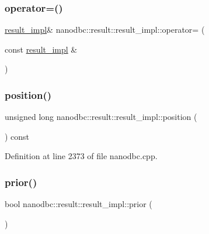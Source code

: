 \subsubsection{\texorpdfstring{operator=()}{operator=()}}
{\footnotesize\ttfamily \mbox{\hyperlink{classnanodbc_1_1result_1_1result__impl}{result\+\_\+impl}}\& nanodbc\+::result\+::result\+\_\+impl\+::operator= (\begin{DoxyParamCaption}\item[{const \mbox{\hyperlink{classnanodbc_1_1result_1_1result__impl}{result\+\_\+impl}} \&}]{ }\end{DoxyParamCaption})\hspace{0.3cm}{\ttfamily [delete]}}

\mbox{\label{classnanodbc_1_1result_1_1result__impl_a7e39dd29b851a1fedcd56d75fb2a0480}} 
\subsubsection{\texorpdfstring{position()}{position()}}
{\footnotesize\ttfamily unsigned long nanodbc\+::result\+::result\+\_\+impl\+::position (\begin{DoxyParamCaption}{ }\end{DoxyParamCaption}) const\hspace{0.3cm}{\ttfamily [inline]}}



Definition at line 2373 of file nanodbc.\+cpp.

\mbox{\label{classnanodbc_1_1result_1_1result__impl_a75c99a62090938df3db2a889f8df6866}} 
\subsubsection{\texorpdfstring{prior()}{prior()}}
{\footnotesize\ttfamily bool nanodbc\+::result\+::result\+\_\+impl\+::prior (\begin{DoxyParamCaption}{ }\end{DoxyParamCaption})\hspace{0.3cm}{\ttfamily [inline]}}



